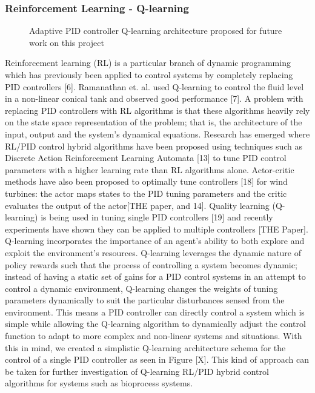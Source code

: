 \documentclass[conference]{IEEEtran}
\theoremstyle{definition}
\begin{document}
\subsubsection{Reinforcement Learning - Q-learning}
\begin{figure}
    \caption{Adaptive PID controller Q-learning architecture proposed for future work on this project}
    \label{q-learning}
\end{figure}
Reinforcement learning (RL) is a particular branch of dynamic programming which has previously been applied to control systems by completely replacing PID controllers [6]. Ramanathan et. al. used Q-learning to control the fluid level in a non-linear conical tank and observed good performance [7]. A problem with replacing PID controllers with RL algorithms is that these algorithms heavily rely on the state space representation of the problem; that is, the architecture of the input, output and the system's dynamical equations. 
Research has emerged where RL/PID control hybrid algorithms have been proposed using techniques such as Discrete Action Reinforcement Learning Automata [13] to tune PID control parameters with a higher learning rate than RL algorithms alone. Actor-critic methods have also been proposed to optimally tune controllers [18] for wind turbines: the actor maps states to the PID tuning parameters and the critic evaluates the output of the actor[THE paper, and 14]. Quality learning (Q-learning) is being used in tuning single PID controllers [19] and recently experiments have shown they can be applied to multiple controllers [THE Paper]. Q-learning incorporates the importance of an agent's ability to both explore and exploit the environment's resources. Q-learning leverages the dynamic nature of policy rewards such that the process of controlling a system becomes dynamic; instead of having a static set of gains for a PID control systems in an attempt to control a dynamic environment, Q-learning changes the weights of tuning parameters dynamically to suit the particular disturbances sensed from the environment. This means a PID controller can directly control a system which is simple while allowing the Q-learning algorithm to dynamically adjust the control function to adapt to more complex and non-linear systems and situations. With this in mind, we created a simplistic Q-learning architecture schema for the control of a single PID controller as seen in Figure [X]. This kind of approach can be taken for further investigation of Q-learning RL/PID hybrid control algorithms for systems such as bioprocess systems.
\end{document}
